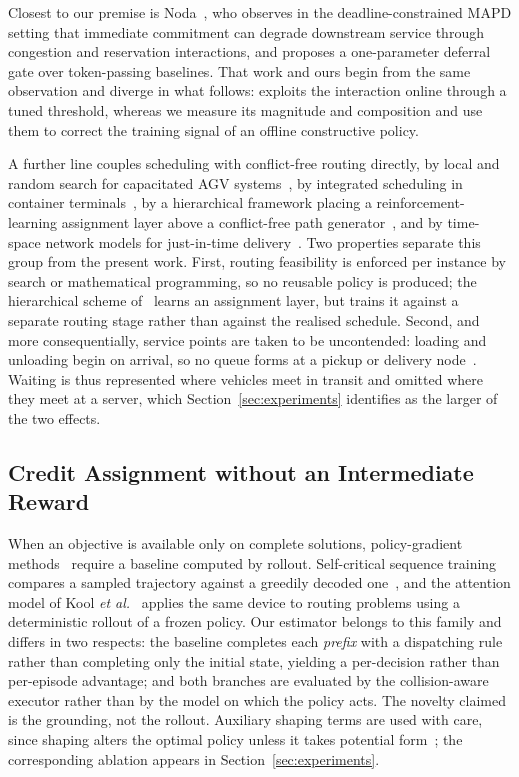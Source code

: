 Closest to our premise is Noda~\cite{noda2026deferral}, who observes in the
deadline-constrained MAPD setting that immediate commitment can degrade
downstream service through congestion and reservation interactions, and
proposes a one-parameter deferral gate over token-passing baselines. That
work and ours begin from the same observation and diverge in what follows:
\cite{noda2026deferral} exploits the interaction online through a tuned
threshold, whereas we measure its magnitude and composition and use them to
correct the training signal of an offline constructive policy.

A further line couples scheduling with conflict-free routing directly, by
local and random search for capacitated AGV
systems~\cite{miyamoto2016local}, by integrated scheduling in container
terminals~\cite{zhong2020integrated}, by a hierarchical framework placing a
reinforcement-learning assignment layer above a conflict-free path
generator~\cite{li2024hierarchical}, and by time-space network models for
just-in-time delivery~\cite{nishida2023jit}. Two properties separate this
group from the present work. First, routing feasibility is enforced per
instance by search or mathematical programming, so no reusable policy is
produced; the hierarchical scheme of~\cite{li2024hierarchical} learns an
assignment layer, but trains it against a separate routing stage rather than
against the realised schedule. Second, and more consequentially, service
points are taken to be uncontended: loading and unloading begin on arrival,
so no queue forms at a pickup or delivery node~\cite{nishida2023jit}.
Waiting is thus represented where vehicles meet in transit and omitted where
they meet at a server, which Section~\ref{sec:experiments} identifies as the
larger of the two effects.

\subsection{Credit Assignment without an Intermediate Reward}

When an objective is available only on complete solutions, policy-gradient
methods~\cite{williams1992reinforce} require a baseline computed by rollout.
Self-critical sequence training compares a sampled trajectory against a
greedily decoded one~\cite{rennie2017self}, and the attention model of Kool
\emph{et al.}~\cite{kool2019attention} applies the same device to routing
problems using a deterministic rollout of a frozen policy. Our estimator
belongs to this family and differs in two respects: the baseline completes
each \emph{prefix} with a dispatching rule rather than completing only the
initial state, yielding a per-decision rather than per-episode advantage;
and both branches are evaluated by the collision-aware executor rather than
by the model on which the policy acts. The novelty claimed is the grounding,
not the rollout. Auxiliary shaping terms are used with care, since shaping
alters the optimal policy unless it takes potential form~\cite{ng1999shaping};
the corresponding ablation appears in Section~\ref{sec:experiments}.

